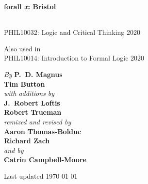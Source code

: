 


\pagestyle{empty}

\vspace*{80pt}



\begin{center}
\fontsize{30pt}{24pt}\sffamily
\selectfont
  \textbf{forall\!
  {\fontsize{37pt}{24pt}\selectfont\rmfamily\textit{x}}: 
  Bristol}
\end{center}

\bigskip \fontsize{12pt}{16pt}\selectfont
{}\\
PHIL10032: Logic and Critical Thinking 2020

\medskip \noindent Also used in\\
PHIL10014: Introduction to Formal Logic 2020 


\vfill\noindent
\fontsize{12pt}{16pt}\selectfont \textit{By } \textbf{P.~D. Magnus}\\
\textbf{Tim Button}\\
\textit{with additions by}\\
\textbf{J.~Robert Loftis}\\
\textbf{Robert Trueman}\\
\textit{remixed and revised by}\\
\textbf{Aaron Thomas-Bolduc}\\ \textbf{Richard Zach}\\
\textit{and by}\\
\textbf{Catrin Campbell-Moore}

\vfill
\noindent Last updated \today\par



\newpage


